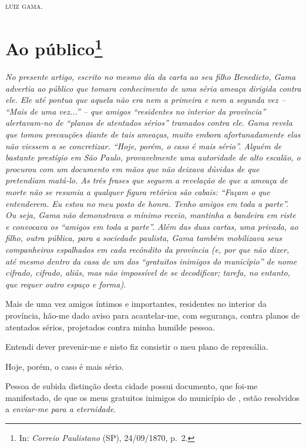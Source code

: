 {\begin{flushright}
\textsc{luiz gama}.
\end{flushright}


\chapter{Ao público\footnote{ In: \emph{Correio Paulistano} (SP), 24/09/1870, p.~2.}} %


\begin{didascalia}
\emph{No presente artigo, escrito no mesmo dia da carta ao seu filho
Benedicto, Gama advertia ao público que tomara conhecimento de uma séria
ameaça dirigida contra ele. Ele até pontua que aquela não era nem a
primeira e nem a segunda vez -- ``Mais de uma vez...'' -- que amigos
``residentes no interior da província'' alertavam-no de ``planos de
atentados sérios'' tramados contra ele. Gama revela que tomou precauções
diante de tais ameaças, muito embora afortunadamente elas não viessem a
se concretizar. ``Hoje, porém, o caso é mais sério''. Alguém de bastante
prestígio em São Paulo, provavelmente uma autoridade de alto escalão, o
procurou com um documento em mãos que não deixava dúvidas de que
pretendiam matá-lo. As três frases que seguem a revelação de que a
ameaça de morte não se resumia a qualquer figura retórica são cabais:
``Façam o que entenderem. Eu estou no meu posto de honra. Tenho amigos em
toda a parte''. Ou seja, Gama não demonstrava o mínimo receio, mantinha a
bandeira em riste e convocava os ``amigos em toda a parte''. Além das duas
cartas, uma privada, ao filho, outra pública, para a sociedade paulista,
Gama também mobilizava seus companheiros espalhados em cada recôndito da
província (e, por que não dizer, até mesmo dentro da casa de um dos
``gratuitos inimigos do município'' de nome cifrado, cifrado, aliás, mas
não impossível de se decodificar; tarefa, no entanto, que requer outro
espaço e forma).}
\end{didascalia}

\asterisc{}

Mais de uma vez amigos íntimos e importantes, residentes no interior da
província, hão-me dado aviso para acautelar-me, com segurança, contra
planos de atentados sérios, projetados contra minha humilde pessoa.

Entendi dever prevenir-me e nisto fiz consistir o meu plano de
represália.

Hoje, porém, o caso é mais sério.

Pessoa de subida distinção desta cidade possui documento, que foi-me
manifestado, de que os meus gratuitos inimigos do município de \asterisc{},
estão resolvidos a \emph{enviar-me para a eternidade}.

}
